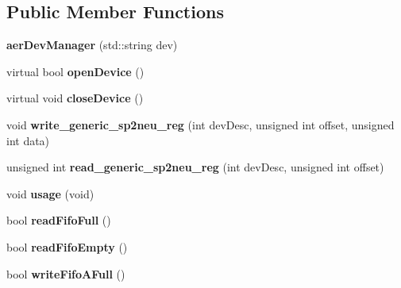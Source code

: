 \subsection*{Public Member Functions}
\begin{DoxyCompactItemize}
\item 
\hypertarget{classaerDevManager_a3114113a72907c80d397959c1306e8d6}{{\bfseries aer\-Dev\-Manager} (std\-::string dev)}\label{classaerDevManager_a3114113a72907c80d397959c1306e8d6}

\item 
\hypertarget{classaerDevManager_ab6382b0978b9c7db2efde105c27cac5a}{virtual bool {\bfseries open\-Device} ()}\label{classaerDevManager_ab6382b0978b9c7db2efde105c27cac5a}

\item 
\hypertarget{classaerDevManager_ad5b901f414b292b2a18289abdd0486b1}{virtual void {\bfseries close\-Device} ()}\label{classaerDevManager_ad5b901f414b292b2a18289abdd0486b1}

\item 
\hypertarget{classaerDevManager_a3c73a8e16c315157801c9bf75e70fc53}{void {\bfseries write\-\_\-generic\-\_\-sp2neu\-\_\-reg} (int dev\-Desc, unsigned int offset, unsigned int data)}\label{classaerDevManager_a3c73a8e16c315157801c9bf75e70fc53}

\item 
\hypertarget{classaerDevManager_a22005a9f33a1c2ae5e8594b9b42293b9}{unsigned int {\bfseries read\-\_\-generic\-\_\-sp2neu\-\_\-reg} (int dev\-Desc, unsigned int offset)}\label{classaerDevManager_a22005a9f33a1c2ae5e8594b9b42293b9}

\item 
\hypertarget{classaerDevManager_ae31bd6618aeb35b6559d1dc0d405b8c3}{void {\bfseries usage} (void)}\label{classaerDevManager_ae31bd6618aeb35b6559d1dc0d405b8c3}

\item 
\hypertarget{classaerDevManager_a995c294f2358ceba18af3a92d4667bd0}{bool {\bfseries read\-Fifo\-Full} ()}\label{classaerDevManager_a995c294f2358ceba18af3a92d4667bd0}

\item 
\hypertarget{classaerDevManager_a814e9fc1f2f2b9be6e35af2e9e4556c2}{bool {\bfseries read\-Fifo\-Empty} ()}\label{classaerDevManager_a814e9fc1f2f2b9be6e35af2e9e4556c2}

\item 
\hypertarget{classaerDevManager_a2bcc580c4902eae1083e84576fe3fe2c}{bool {\bfseries write\-Fifo\-A\-Full} ()}\label{classaerDevManager_a2bcc580c4902eae1083e84576fe3fe2c}


\end{DoxyCompactItemize}

